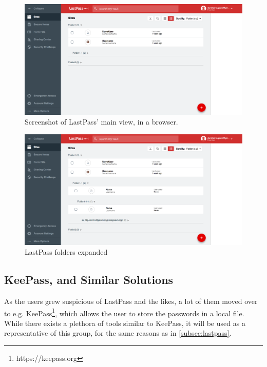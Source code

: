 			\begin{figure}[h!]
				\centering
				\includegraphics[width=\textwidth]{figures/analysis/lastpass_main_2.png}
				\caption{Screenshot of LastPass' main view, in a browser.}
				\label{fig:lastpass_main}
			\end{figure}

			\begin{figure}[h!]
				\centering
				\includegraphics[width=\textwidth]{figures/analysis/lastpass_main_2_expanded.png}
				\caption{LastPass folders expanded}
				\label{fig:lastpass_main_expanded}
			\end{figure}


		\subsection*{KeePass, and Similar Solutions}
			As the users grew suspicious of LastPass and the likes, a lot of them moved over to e.g. KeePass\footnote{https://keepass.org}, which allows the user to store the passwords in a local file. While there exists a plethora of tools similar to KeePass,  it will be used as a representative of this group, for the same reasons as in \ref{subsec:lastpass}.

